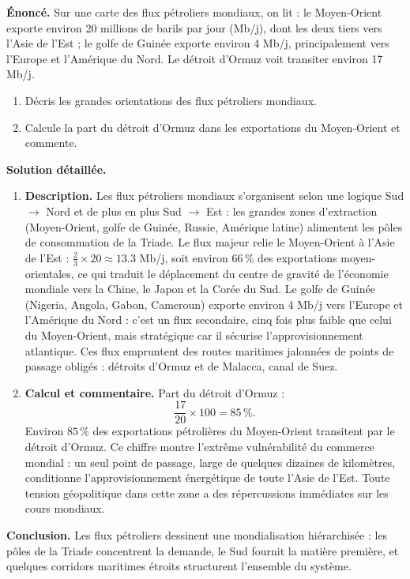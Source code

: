\documentclass[11pt]{article}
\begin{document}
\begin{exoresolu}
\textbf{Énoncé.} Sur une carte des flux pétroliers mondiaux, on lit : le Moyen-Orient exporte environ \num{20} millions de barils par jour (Mb/j), dont les deux tiers vers l'Asie de l'Est ; le golfe de Guinée exporte environ \num{4} Mb/j, principalement vers l'Europe et l'Amérique du Nord. Le détroit d'Ormuz voit transiter environ \num{17} Mb/j.
\begin{enumerate}
\item Décris les grandes orientations des flux pétroliers mondiaux.
\item Calcule la part du détroit d'Ormuz dans les exportations du Moyen-Orient et commente.
\end{enumerate}
\tcblower
\textbf{Solution détaillée.}
\begin{enumerate}
\item \textbf{Description.} Les flux pétroliers mondiaux s'organisent selon une logique Sud $\rightarrow$ Nord et de plus en plus Sud $\rightarrow$ Est : les grandes zones d'extraction (Moyen-Orient, golfe de Guinée, Russie, Amérique latine) alimentent les pôles de consommation de la Triade. Le flux majeur relie le Moyen-Orient à l'Asie de l'Est : $\frac{2}{3}\times 20 \approx \num{13,3}$ Mb/j, soit environ $66\,\%$ des exportations moyen-orientales, ce qui traduit le déplacement du centre de gravité de l'économie mondiale vers la Chine, le Japon et la Corée du Sud. Le golfe de Guinée (Nigeria, Angola, Gabon, Cameroun) exporte environ \num{4} Mb/j vers l'Europe et l'Amérique du Nord : c'est un flux secondaire, cinq fois plus faible que celui du Moyen-Orient, mais stratégique car il sécurise l'approvisionnement atlantique. Ces flux empruntent des routes maritimes jalonnées de points de passage obligés : détroits d'Ormuz et de Malacca, canal de Suez.
\item \textbf{Calcul et commentaire.} Part du détroit d'Ormuz :
\[ \frac{17}{20}\times 100 = 85\,\%. \]
Environ $85\,\%$ des exportations pétrolières du Moyen-Orient transitent par le détroit d'Ormuz. Ce chiffre montre l'extrême vulnérabilité du commerce mondial : un seul point de passage, large de quelques dizaines de kilomètres, conditionne l'approvisionnement énergétique de toute l'Asie de l'Est. Toute tension géopolitique dans cette zone a des répercussions immédiates sur les cours mondiaux.
\end{enumerate}
\textbf{Conclusion.} Les flux pétroliers dessinent une mondialisation hiérarchisée : les pôles de la Triade concentrent la demande, le Sud fournit la matière première, et quelques corridors maritimes étroits structurent l'ensemble du système.
\end{exoresolu}
\end{document}
